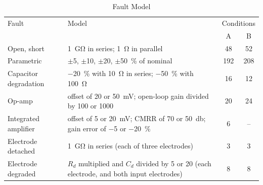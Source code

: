 \begin{table}[!t]
\caption{Fault Model}
\label{tab:faults}
\centering
\setlength{\tabcolsep}{3pt}
\begin{tabular}{@{}p{}p{}cc@{}}
\toprule
Fault & Model & \multicolumn{2}{c}{Conditions} \\
 & & A & B \\
\midrule
Open, short & \SI{1}{\giga\ohm} in series; \SI{1}{\ohm} in parallel & 48 & 52 \\
Parametric & $\pm$5, $\pm$10, $\pm$20, $\pm$\SI{50}{\percent} of nominal & 192 & 208 \\
Capacitor degradation & $-$\SI{20}{\percent} with \SI{10}{\ohm} in series; $-$\SI{50}{\percent} with \SI{100}{\ohm} & 16 & 12 \\
Op-amp & offset of 20 or \SI{50}{\milli\volt}; open-loop gain divided by 100 or 1000 & 20 & 24 \\
Integrated amplifier & offset of 5 or \SI{20}{\milli\volt}; CMRR of 70 or \SI{50}{\decibel}; gain error of $-$5 or $-$\SI{20}{\percent} & 6 & -- \\
Electrode detached & \SI{1}{\giga\ohm} in series (each of three electrodes) & 3 & 3 \\
Electrode degraded & $R_d$ multiplied and $C_d$ divided by 5 or 20 (each electrode, and both input electrodes) & 8 & 8 \\
\bottomrule
\end{tabular}
\end{table}
